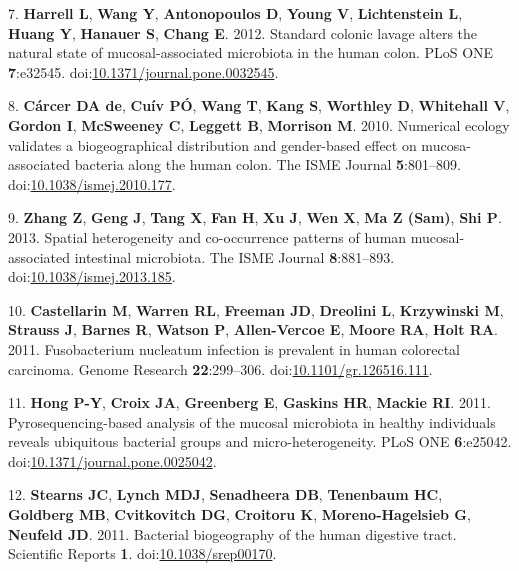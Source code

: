 \documentclass[11pt,]{article}
\begin{document}
\hypertarget{ref-Harrell2012}{}
7. \textbf{Harrell L}, \textbf{Wang Y}, \textbf{Antonopoulos D},
\textbf{Young V}, \textbf{Lichtenstein L}, \textbf{Huang Y},
\textbf{Hanauer S}, \textbf{Chang E}. 2012. Standard colonic lavage
alters the natural state of mucosal-associated microbiota in the human
colon. PLoS ONE \textbf{7}:e32545.
doi:\href{https://doi.org/10.1371/journal.pone.0032545}{10.1371/journal.pone.0032545}.

\hypertarget{ref-deCarcer2010}{}
8. \textbf{Cárcer DA de}, \textbf{Cuív PÓ}, \textbf{Wang T},
\textbf{Kang S}, \textbf{Worthley D}, \textbf{Whitehall V},
\textbf{Gordon I}, \textbf{McSweeney C}, \textbf{Leggett B},
\textbf{Morrison M}. 2010. Numerical ecology validates a biogeographical
distribution and gender-based effect on mucosa-associated bacteria along
the human colon. The ISME Journal \textbf{5}:801--809.
doi:\href{https://doi.org/10.1038/ismej.2010.177}{10.1038/ismej.2010.177}.

\hypertarget{ref-Zhang2013}{}
9. \textbf{Zhang Z}, \textbf{Geng J}, \textbf{Tang X}, \textbf{Fan H},
\textbf{Xu J}, \textbf{Wen X}, \textbf{Ma Z (Sam)}, \textbf{Shi P}.
2013. Spatial heterogeneity and co-occurrence patterns of human
mucosal-associated intestinal microbiota. The ISME Journal
\textbf{8}:881--893.
doi:\href{https://doi.org/10.1038/ismej.2013.185}{10.1038/ismej.2013.185}.

\hypertarget{ref-Castellarin2011}{}
10. \textbf{Castellarin M}, \textbf{Warren RL}, \textbf{Freeman JD},
\textbf{Dreolini L}, \textbf{Krzywinski M}, \textbf{Strauss J},
\textbf{Barnes R}, \textbf{Watson P}, \textbf{Allen-Vercoe E},
\textbf{Moore RA}, \textbf{Holt RA}. 2011. Fusobacterium nucleatum
infection is prevalent in human colorectal carcinoma. Genome Research
\textbf{22}:299--306.
doi:\href{https://doi.org/10.1101/gr.126516.111}{10.1101/gr.126516.111}.

\hypertarget{ref-Hong2011}{}
11. \textbf{Hong P-Y}, \textbf{Croix JA}, \textbf{Greenberg E},
\textbf{Gaskins HR}, \textbf{Mackie RI}. 2011. Pyrosequencing-based
analysis of the mucosal microbiota in healthy individuals reveals
ubiquitous bacterial groups and micro-heterogeneity. PLoS ONE
\textbf{6}:e25042.
doi:\href{https://doi.org/10.1371/journal.pone.0025042}{10.1371/journal.pone.0025042}.

\hypertarget{ref-Stearns2011}{}
12. \textbf{Stearns JC}, \textbf{Lynch MDJ}, \textbf{Senadheera DB},
\textbf{Tenenbaum HC}, \textbf{Goldberg MB}, \textbf{Cvitkovitch DG},
\textbf{Croitoru K}, \textbf{Moreno-Hagelsieb G}, \textbf{Neufeld JD}.
2011. Bacterial biogeography of the human digestive tract. Scientific
Reports \textbf{1}.
doi:\href{https://doi.org/10.1038/srep00170}{10.1038/srep00170}.
\end{document}
